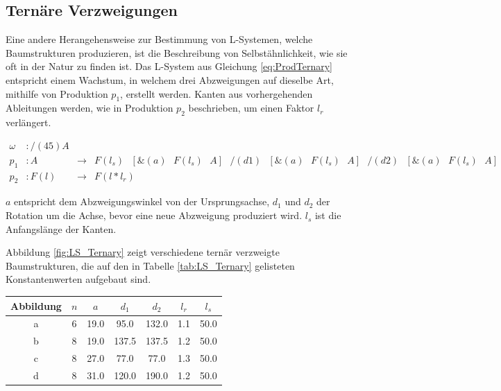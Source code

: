 \subsection{Ternäre Verzweigungen}
Eine andere Herangehensweise zur Bestimmung von L-Systemen, welche Baumstrukturen produzieren, ist die Beschreibung von Selbstähnlichkeit, wie sie oft in der Natur zu finden ist. \cite[S.173]{ABOP:04} Das L-System aus Gleichung \ref{eq:ProdTernary} entspricht einem Wachstum, in welchem drei Abzweigungen auf dieselbe Art, mithilfe von Produktion $p_1$, erstellt werden. Kanten aus vorhergehenden Ableitungen werden, wie in Produktion $p_2$ beschrieben, um einen Faktor $l_r$ verlängert. \cite[S.58]{ABOP:04}

\begin{equation}
\begin{array}{llll}
\omega & : /(45)A \\
p_1 & : A &\rightarrow& F(l_s)\text{ }[\&(a)\text{ }F(l_s)\text{ }A]\text{ }/(d1)\text{ }[\&(a)\text{ }F(l_s)\text{ }A]\text{ }/(d2)\text{ }[\&(a)\text{ }F(l_s)\text{ }A] \\
p_2 &  : F(l) &\rightarrow& F(l * l_r)
\end{array}
\label{eq:ProdTernary}
\end{equation} 
\cite[S.60]{ABOP:04}

$a$ entspricht dem Abzweigungswinkel von der Ursprungsachse, $d_1$ und $d_2$ der Rotation um die Achse, bevor eine neue Abzweigung produziert wird. $l_s$ ist die Anfangslänge der Kanten. \cite[S.58]{ABOP:04}

Abbildung \ref{fig:LS_Ternary} zeigt verschiedene ternär verzweigte Baumstrukturen, die auf den in Tabelle \ref{tab:LS_Ternary} gelisteten Konstantenwerten aufgebaut sind.

\begin{center}
	\begin{tabulary}{\textwidth}{|C|C|C|C|C|C|C|}
		\hline 
		Abbildung & $n$ & $a$ & $d_1$ & $d_2$ & $l_r$ & $l_s$ \\ 
		\hline 
		a & 6 & 19.0 & 95.0 & 132.0 & 1.1 & 50.0 \\ 
		\hline 
		b & 8 & 19.0 & 137.5 & 137.5 & 1.2 & 50.0 \\ 
		\hline 
		c & 8 & 27.0 & 77.0 & 77.0 & 1.3 & 50.0 \\ 
		\hline 
		d & 8 & 31.0 & 120.0 & 190.0 & 1.2 & 50.0 \\ 
		\hline 
	\end{tabulary} 
	\label{tab:LS_Ternary}
\end{center}

